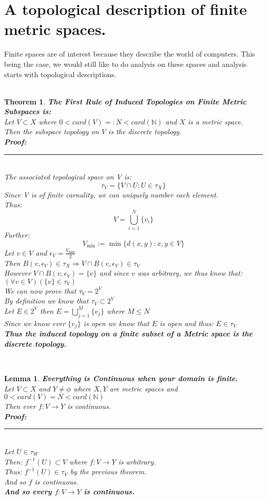 \documentclass[12pt]{extarticle}
\theoremstyle{plain}
\newtheorem{thm}{Theorem}[section]
\theoremstyle{plain}
\theoremstyle{plain}
\newtheorem{lma}{Lemma}[section]
\theoremstyle{Definition}
\theoremstyle{Definition}
\theoremstyle{plain}
\newcommand{\cut}[0]{\noindent\framebox[\linewidth]{\rule{\linewidth}{2pt}}\\}
\newcommand{\prof}[0]{	\noindent \textbf{Proof:} \rule{500pt}{2pt} \\ }
\begin{document}
	\section{A topological description of finite metric spaces.}
	Finite spaces are of interest because they describe the world of computers. This being the case, we would still like to do analysis on these spaces and analysis starts with topological descriptions. \\
	\cut
	\begin{thm} \textbf{The First Rule of Induced Topologies on Finite Metric Subspaces is:} \\
		Let $V \subset X$ where $0 < card(V) =: N < card(\mathbb{N})$ and $X$ is a metric space. \\
		Then the subspace topology on $V$ is the discrete topology. \\ 
		\prof
		The associated topological space on V is: 
		$$\tau_V = \{V \cap U : U \in \tau_X\}$$
		Since V is of finite carnality, we can uniquely number each element. \\ 
		Thus:
		$$V = \bigcup_{i=1}^N \{v_i\}$$
		Further: 
		$$V_{\min} := \min\{d(x,y) : x,y \in V\} $$
		Let $v \in V$ and $\epsilon_V = \frac{V_{\min}}{2}$ \\ 
		Then $B(v,\epsilon_V) \in \tau_X \Rightarrow V \cap B(v,\epsilon_V) \in \tau_V$ \\ 
		However $V \cap B(v,\epsilon_V)  = \{v\}$ and since $v$ was arbitrary, we thus know that: $(\forall v \in V)(\{v\} \in \tau_V)$ \\
		We can now prove that $\tau_V = 2^V$ \\ 
		By definition we know that $\tau_V \subset 2^V$ \\ 
		Let $E \in 2^V$ then $E = \bigcup_{j=1}^M \{v_j\}$ where $M \leq N$ \\ 
		Since we know ever $\{v_j\}$ is open we know that $E$ is open and thus: $E \in \tau_V$ \\ 
		\textbf{Thus the induced topology on a finite subset of a Metric space is the discrete topology. }		
	\end{thm}
	\cut
	\begin{lma} \textbf{Everything is Continuous when your domain is finite.} \\ 
			Let $V \subset X$ and $Y \not = \phi$ where $X,Y$ are metric spaces and $0 < card(V) = N < card(\mathbb{N})$ \\
			Then ever $f : V \to Y$ is continuous. \\ 
			\prof
			Let $U \in \tau_W$ \\ 
			Then: $f^{-1}(U) \subset V$ where $f : V \to Y$ is arbitrary. \\
			Thus: $f^{-1}(U) \in \tau_V$ by the previous theorem. \\
			And so $f$ is continuous. \\
			\textbf{And so every $f : V \to Y$ is continuous. }
	\end{lma}
\end{document}
